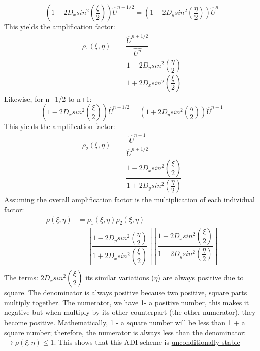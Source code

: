 \documentclass[12pt]{article}
\begin{document}
 	 \begin{equation}
 	 	\left(1+2D_xsin^2\left(\dfrac{\xi}{2}\right)\right)\hat{U}^{n+1/2} = \left(1-2D_ysin^2\left(\dfrac{\eta}{2}\right)\right)\hat{U}^{n}
 	 \end{equation}
 	 This yields the amplification factor:
 	 \begin{align*}
 	 	\rho_1(\xi,\eta) &= \dfrac{\hat{U}^{n+1/2}}{\hat{U^n}}\\ &=\dfrac{1-2D_ysin^2\left(\dfrac{\eta}{2}\right)}{1+2D_xsin^2\left(\dfrac{\xi}{2}\right)}
 	 \end{align*}
 	 Likewise, for n+1/2 to n+1: 	 
 	 \begin{equation}
 	 \left(1-2D_xsin^2\left(\dfrac{\xi}{2}\right)\right)\hat{U}^{n+1/2} = \left(1+2D_ysin^2\left(\dfrac{\eta}{2}\right)\right)\hat{U}^{n+1}
 	 \end{equation}
 	 This yields the amplification factor:
 	 \begin{align*}
 	 \rho_2(\xi,\eta) &= \dfrac{\hat{U}^{n+1}}{\hat{U}^{n+1/2}}\\ &=\dfrac{1-2D_xsin^2\left(\dfrac{\xi}{2}\right)}{1+2D_ysin^2\left(\dfrac{\eta}{2}\right)}
 	 \end{align*}
 	 Assuming the overall amplification factor is the multiplication of each individual factor:
 	 \begin{align*}
 	 	\rho(\xi,\eta) &= \rho_1(\xi,\eta)\rho_2(\xi,\eta)\\
 	 	&=\left[\dfrac{1-2D_ysin^2\left(\dfrac{\eta}{2}\right)}{1+2D_xsin^2\left(\dfrac{\xi}{2}\right)}\right]    \left[\dfrac{1-2D_xsin^2\left(\dfrac{\xi}{2}\right)}{1+2D_ysin^2\left(\dfrac{\eta}{2}\right)}\right]\\
 	 \end{align*}
 	 The terms: $2D_xsin^2\left(\dfrac{\xi}{2}\right)$ its similar variations ($\eta$) are always positive due to square. The denominator is always positive because two positive, square parts multiply together. The numerator, we have 1- a positive number, this makes it negative but when multiply by its other counterpart (the other numerator), they become positive. Mathematically, 1 - a square number will be less than 1 + a square number; therefore, the numerator is always less than the denominator: $\rightarrow \rho(\xi,\eta) \leq 1 $. This shows that this ADI scheme is \underline{unconditionally stable}
 	 
\end{document}
